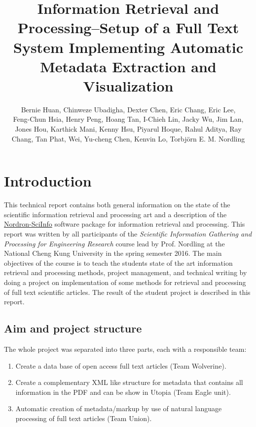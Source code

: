 \documentclass[a4paper,twocolumn,twoside]{article}
\begin{document}
 
	
	\title{Information Retrieval and Processing--Setup of a Full Text System Implementing Automatic Metadata Extraction and Visualization}
	\author{Bernie Huan, Chinweze Ubadigha, Dexter Chen, Eric Chang, Eric Lee, \\
		Feng-Chun Hsia, Henry Peng, Hoang Tan, I-Chieh Lin, Jacky Wu, Jim Lan, \\
		Jones Hou, Karthick Mani, Kenny Hsu, Piyarul Hoque, Rahul Aditya, Ray \\
		Chang, Tan Phat, Wei, Yu-cheng Chen, Kenvin Lo, Torbjörn E. M. Nordling}  %
	\maketitle   
	
	\section{Introduction}
	\label{Introduction}
	
	This technical report contains both general information on the state of the scientific information retrieval and processing art and a description of the \href{https://bitbucket.org/nordron/nordron-sciinfo}{Nordron-SciInfo} software package for information retrieval and processing. 
	This report was written by all participants of the \emph{Scientific Information Gathering and Processing for Engineering Research} course lead by Prof. Nordling at the National Cheng Kung University in the spring semester 2016. The main objectives of the course is to teach the students state of the art information retrieval and processing methods, project management, and technical writing by doing a project on implementation of some methods for retrieval and processing of full text scientific articles. The result of the student project is described in this report.
	
	\subsection{Aim and project structure}
	\label{aim}

	The whole project was separated into three parts, each with a responsible team:
	\begin{enumerate}
		\item Create a data base of open access full text articles (Team Wolverine).
		\item Create a complementary XML like structure for metadata that contains all information in the PDF and can be show in Utopia (Team Eagle unit).
		\item Automatic creation of metadata/markup by use of natural language processing of full text articles (Team Union).
	\end{enumerate}
	
\end{document}
